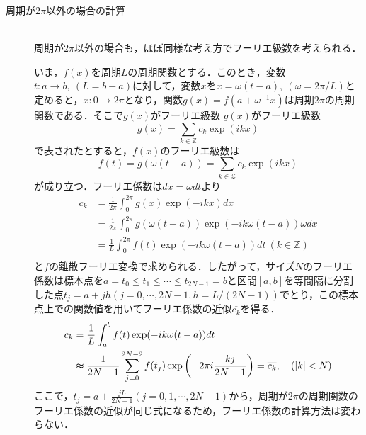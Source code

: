 \documentclass[11pt,a4paper,titlepage]{jsreport}
\theoremstyle{definition}
\begin{document}
\begin{description}
  \item[周期が$2\pi$以外の場合の計算]
    \quad\\
    周期が$2\pi$以外の場合も，ほぼ同様な考え方でフーリエ級数を考えられる．

    いま，$f(x)$を周期$L$の周期関数とする．このとき，変数$t:a\rightarrow b,\ (L=b-a)$に対して，変数$x$を$x=\omega (t-a),\ (\omega = 2\pi /L)$と定めると，$x:0\rightarrow 2\pi$となり，関数$g(x)=f(a+\omega^{-1}x)$は周期$2\pi$の周期関数である．そこで$g(x)$がフーリエ級数
    $g(x)$がフーリエ級数
    \begin{equation*}
      g(x) = \sum_{k\in\mathbb{Z}} c_k \exp(ikx)
    \end{equation*}
    で表されたとすると，$f(x)$のフーリエ級数は
    \begin{equation*}
      f(t) = g(\omega (t-a)) = \sum_{k\in\mathcal{Z}} c_k \exp(ikx)
    \end{equation*}
    が成り立つ．フーリエ係数は$dx=\omega dt$より
    \begin{align*}
      c_k & = \frac{1}{2\pi} \int_{0}^{2\pi} g(x) \exp(-ikx) dx                              \\
          & = \frac{1}{2\pi} \int_{0}^{2\pi} g(\omega (t-a)) \exp(-ik\omega (t-a)) \omega dx \\
          & = \frac{1}{L} \int_{0}^{2\pi} f(t) \exp(-ik\omega (t-a)) dt   \ (k\in\mathbb{Z}) \\
    \end{align*}
    と$f$の離散フーリエ変換で求められる．したがって，サイズ$N$のフーリエ係数は標本点を$a=t_0 \leq t_1 \leq \cdots \leq t_{2N-1}=b$と区間$[a,b]$を等間隔に分割した点$t_j=a+jh(j=0,\cdots,2N-1,h=L/(2N-1))$でとり，この標本点上での関数値を用いてフーリエ係数の近似$\overline{c_k}$を得る．
    \begin{align*}
      c_k & = \frac{1}{L} \int_{a}^{b} f(t) \exp(-ik\omega (t-a)) dt                                                                     \\
          & \thickapprox \frac{1}{2N-1} \sum_{j=0}^{2N-2} f(t_j) \exp\left(-2\pi i \frac{kj}{2N-1}\right) = \overline{c_k},\quad (|k|<N)
    \end{align*}
    ここで，$t_j=a+\frac{jL}{2N-1}(j=0,1,\cdots,2N-1)$から，周期が$2\pi$の周期関数のフーリエ係数の近似が同じ式になるため，フーリエ係数の計算方法は変わらない．
\end{description}
\end{document}
